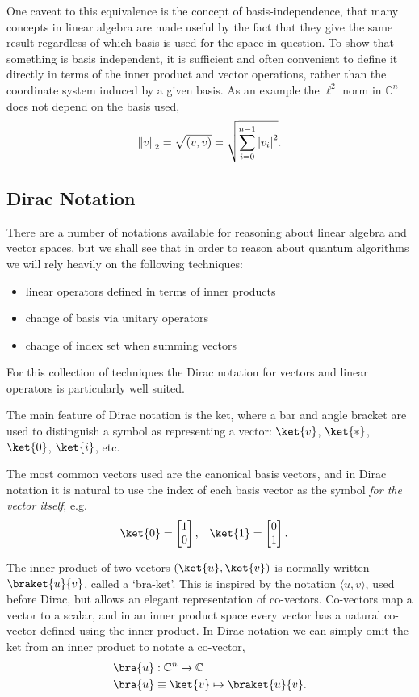 One caveat to this equivalence is the concept of basis-independence, that many concepts in linear algebra are made useful by the fact that they give the same result regardless of which basis is used for the space in question. To show that something is basis independent, it is sufficient and often convenient to define it directly in terms of the inner product and vector operations, rather than the coordinate system induced by a given basis. As an example the $\ell^2$ norm in $\mathbb{C}^n$ does not depend on the basis used,
\[\left\Vert v \right\Vert_2 = \sqrt{(v, v)} = \sqrt{\sum_{i=0}^{n-1}\left| v_i \right|^2}.\]

\subsection{Dirac Notation}\label{dirac}
There are a number of notations available for reasoning about linear algebra and vector spaces, but we shall see that in order to reason about quantum algorithms we will rely heavily on the following techniques:
\begin{itemize}
	\item linear operators defined in terms of inner products
	\item change of basis via unitary operators
	\item change of index set when summing vectors
\end{itemize}
For this collection of techniques the Dirac notation for vectors and linear operators is particularly well suited.

The main feature of Dirac notation is the ket, where a bar and angle bracket are used to distinguish a symbol as representing a vector: $\ket{v}$, $\ket{*}$, $\ket{0}$, $\ket{i}$, etc.

The most common vectors used are the canonical basis vectors, and in Dirac notation it is natural to use the index of each basis vector as the symbol \textit{for the vector itself}, e.g.
\begin{align*}
	\ket{0} = \left[\begin{matrix}
		1\\
		0
	\end{matrix}\right],
	&&&
	\ket{1} = \left[\begin{matrix}
		0\\
		1
	\end{matrix}\right].
\end{align*}

The inner product of two vectors $(\ket{u}, \ket{v})$ is normally written $\braket{u}{v}$, called a `bra-ket'. This is inspired by the notation $\langle u, v\rangle$, used before Dirac, but allows an elegant representation of co-vectors. Co-vectors map a vector to a scalar, and in an inner product space every vector has a natural co-vector defined using the inner product. In Dirac notation we can simply omit the ket from an inner product to notate a co-vector,
\begin{align*}
	\bra{u} &: \mathbb{C}^n \to \mathbb{C}
	\\\bra{u} &\equiv \ket{v} \mapsto \braket{u}{v}.
\end{align*}

